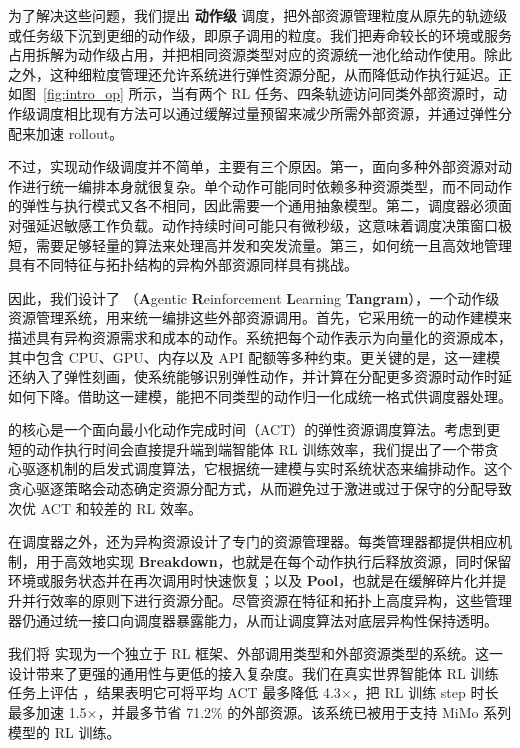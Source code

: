 为了解决这些问题，我们提出 \textbf{动作级} 调度，把外部资源管理粒度从原先的轨迹级或任务级下沉到更细的动作级，即原子调用的粒度。我们把寿命较长的环境或服务占用拆解为动作级占用，并把相同资源类型对应的资源统一池化给动作使用。除此之外，这种细粒度管理还允许系统进行弹性资源分配，从而降低动作执行延迟。正如图~\ref{fig:intro_op} 所示，当有两个 RL 任务、四条轨迹访问同类外部资源时，动作级调度相比现有方法可以通过缓解过量预留来减少所需外部资源，并通过弹性分配来加速 rollout。

不过，实现动作级调度并不简单，主要有三个原因。第一，面向多种外部资源对动作进行统一编排本身就很复杂。单个动作可能同时依赖多种资源类型，而不同动作的弹性与执行模式又各不相同，因此需要一个通用抽象模型。第二，调度器必须面对强延迟敏感工作负载。动作持续时间可能只有微秒级，这意味着调度决策窗口极短，需要足够轻量的算法来处理高并发和突发流量。第三，如何统一且高效地管理具有不同特征与拓扑结构的异构外部资源同样具有挑战。

因此，我们设计了 \sysname（\textbf{A}gentic \textbf{R}einforcement \textbf{L}earning \textbf{Tangram}），一个动作级资源管理系统，用来统一编排这些外部资源调用。首先，它采用统一的动作建模来描述具有异构资源需求和成本的动作。系统把每个动作表示为向量化的资源成本，其中包含 CPU、GPU、内存以及 API 配额等多种约束。更关键的是，这一建模还纳入了弹性刻画，使系统能够识别弹性动作，并计算在分配更多资源时动作时延如何下降。借助这一建模，\sysname 能把不同类型的动作归一化成统一格式供调度器处理。

\sysname 的核心是一个面向最小化动作完成时间（ACT）的弹性资源调度算法。考虑到更短的动作执行时间会直接提升端到端智能体 RL 训练效率，我们提出了一个带贪心驱逐机制的启发式调度算法，它根据统一建模与实时系统状态来编排动作。这个贪心驱逐策略会动态确定资源分配方式，从而避免过于激进或过于保守的分配导致次优 ACT 和较差的 RL 效率。

在调度器之外，\sysname 还为异构资源设计了专门的资源管理器。每类管理器都提供相应机制，用于高效地实现 \textbf{Breakdown}，也就是在每个动作执行后释放资源，同时保留环境或服务状态并在再次调用时快速恢复；以及 \textbf{Pool}，也就是在缓解碎片化并提升并行效率的原则下进行资源分配。尽管资源在特征和拓扑上高度异构，这些管理器仍通过统一接口向调度器暴露能力，从而让调度算法对底层异构性保持透明。

我们将 \sysname 实现为一个独立于 RL 框架、外部调用类型和外部资源类型的系统。这一设计带来了更强的通用性与更低的接入复杂度。我们在真实世界智能体 RL 训练任务上评估 \sysname，结果表明它可将平均 ACT 最多降低 4.3$\times$，把 RL 训练 step 时长最多加速 1.5$\times$，并最多节省 71.2$\%$ 的外部资源。该系统已被用于支持 MiMo 系列模型的 RL 训练。

